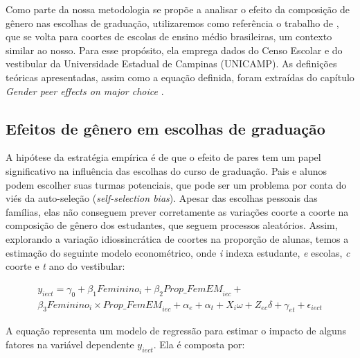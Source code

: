 Como parte da nossa metodologia se propõe a analisar o efeito da composição de gênero nas escolhas de graduação, utilizaremos como referência o trabalho de \cite{Borges2021}, que se volta para coortes de escolas de ensino médio brasileiras, um contexto similar ao nosso. Para esse propósito, ela emprega dados do Censo Escolar e do vestibular da Universidade Estadual de Campinas (UNICAMP). As definições teóricas apresentadas, assim como a equação definida, foram extraídas do capítulo \textit{Gender peer effects on major choice} \autocite{Borges2021}. 

\subsection{Efeitos de gênero em escolhas de graduação}
A hipótese da estratégia empírica é de que o efeito de pares tem um papel significativo na influência das escolhas do curso de graduação. Pais e alunos podem escolher suas turmas potenciais, que pode ser um problema por conta do viés da auto-seleção (\textit{self-selection bias}). Apesar das escolhas pessoais das famílias, elas não conseguem prever corretamente as variações coorte a coorte na composição de gênero dos estudantes, que seguem processos aleatórios. Assim, explorando a variação idiossincrática de coortes na proporção de alunas, temos a estimação do seguinte modelo econométrico, onde \textit{i} indexa estudante, \textit{e} escolas, \textit{c} coorte e \textit{t} ano do vestibular:

\begin{equation}
\begin{split}
y_{iect} = \gamma_0 + \beta_1 \textit{Feminino}_i + \beta_2 \textit{Prop\_FemEM}_{iec} + \\ \beta_3 \textit{Feminino}_i \times \textit{Prop\_FemEM}_{iec} + \alpha_e + \alpha_t + X_i \omega + Z_{ec} \delta + \gamma_{et} + \epsilon_{iect}
\end{split}
\end{equation}

A equação representa um modelo de regressão para estimar o impacto de alguns fatores na variável dependente $y_{iect}$. Ela é composta por:


